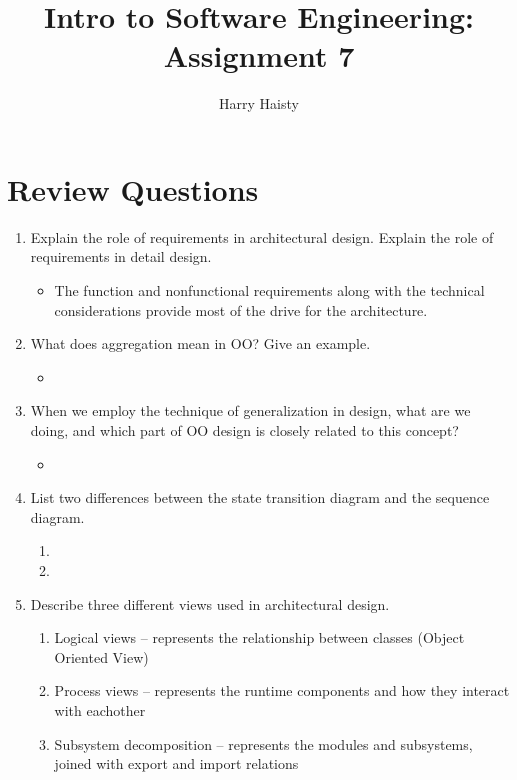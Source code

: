\documentclass[11pt]{article}
\title{Intro to Software Engineering: Assignment 7}
\author{Harry Haisty}
\begin{document}
    \maketitle
    \section*{Review Questions}
    \begin{enumerate}
    
    \item Explain the role of requirements in architectural design. Explain the role of requirements in detail design. 
    \begin{itemize}
        \item[] The function and nonfunctional requirements along with the technical considerations provide most of the drive for the architecture. 
    \end{itemize}

    \item What does aggregation mean in OO? Give an example.
    \begin{itemize}
        \item[] 
    \end{itemize}

    \item When we employ the technique of generalization in design, what are we doing, and which part of OO design is closely related to this concept?
    \begin{itemize}
      \item[]   
    \end{itemize}

    \item List two differences between the state transition diagram and the sequence diagram.
    \begin{enumerate}
        \item[] 
        \item[]     
    \end{enumerate}
   
    \item Describe three different views used in architectural design. 
    \begin{enumerate}
        \item[] Logical views -- represents the relationship between classes (Object Oriented View)
        \item[] Process views -- represents the runtime components and how they interact with eachother
        \item[] Subsystem decomposition -- represents the modules and subsystems, joined with export and import relations
    \end{enumerate}


\end{enumerate}
\end{document}
